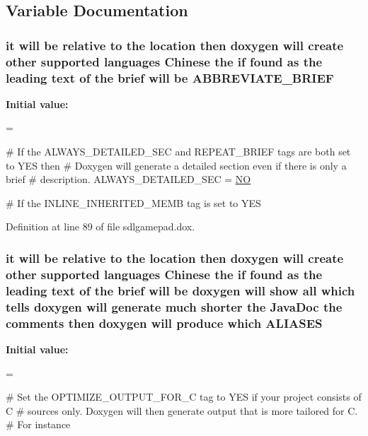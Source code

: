 \subsection{Variable Documentation}
\hypertarget{sdlgamepad_8dox_a122d2428a3db9b3f12d65d76f35275b8}{
\subsubsection[{A\-B\-B\-R\-E\-V\-I\-A\-T\-E\-\_\-\-B\-R\-I\-E\-F}]{\setlength{\rightskip}{0pt plus 5cm}it will be relative to the {\bf location} then doxygen will create other supported languages {\bf Chinese} the {\bf if} found as the leading text of the brief will be A\-B\-B\-R\-E\-V\-I\-A\-T\-E\-\_\-\-B\-R\-I\-E\-F}}\label{sdlgamepad_8dox_a122d2428a3db9b3f12d65d76f35275b8}
{\bfseries Initial value\-:}
\begin{DoxyCode}
=

\textcolor{preprocessor}{# If the ALWAYS\_DETAILED\_SEC and REPEAT\_BRIEF tags are both set to YES then}
\textcolor{preprocessor}{}\textcolor{preprocessor}{# Doxygen will generate a detailed section even if there is only a brief}
\textcolor{preprocessor}{}\textcolor{preprocessor}{# description.}
\textcolor{preprocessor}{}
ALWAYS\_DETAILED\_SEC    = \hyperlink{sdlgamepad_8dox_a0f6a46245280dc38baf9600906aa1393}{NO}

\textcolor{preprocessor}{# If the INLINE\_INHERITED\_MEMB tag is set to YES}
\end{DoxyCode}


Definition at line 89 of file sdlgamepad.\-dox.

\hypertarget{sdlgamepad_8dox_abb9f86499ee6f16a13b6e814f450db18}{
\subsubsection[{A\-L\-I\-A\-S\-E\-S}]{\setlength{\rightskip}{0pt plus 5cm}it will be relative to the {\bf location} then doxygen will create other supported languages {\bf Chinese} the {\bf if} found as the leading text of the brief will be doxygen will show all which tells doxygen will generate much shorter the Java\-Doc the comments then doxygen will produce which A\-L\-I\-A\-S\-E\-S}}\label{sdlgamepad_8dox_abb9f86499ee6f16a13b6e814f450db18}
{\bfseries Initial value\-:}
\begin{DoxyCode}
=

\textcolor{preprocessor}{# Set the OPTIMIZE\_OUTPUT\_FOR\_C tag to YES if your project consists of C}
\textcolor{preprocessor}{}\textcolor{preprocessor}{# sources only. Doxygen will then generate output that is more tailored for C.}
\textcolor{preprocessor}{# For instance}
\end{DoxyCode}


